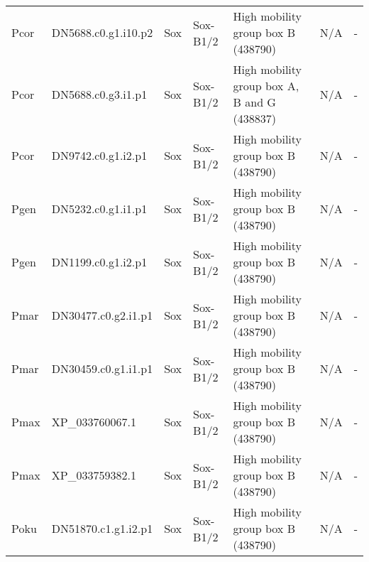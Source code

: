 \documentclass[../main.tex]{subfiles}
\begin{document}
\begin{landscape}
\begin{longtable}{lllllll}
		Pcor           & DN5688.c0.g1.i10.p2   & Sox            & Sox-B1/2            & High mobility group box B (438790)          & N/A                                                                    & -                    \\
		Pcor           & DN5688.c0.g3.i1.p1    & Sox            & Sox-B1/2            & High mobility group box A, B and G (438837) & N/A                                                                    & -                    \\
		Pcor           & DN9742.c0.g1.i2.p1    & Sox            & Sox-B1/2            & High mobility group box B (438790)          & N/A                                                                    & -                    \\
		Pgen           & DN5232.c0.g1.i1.p1    & Sox            & Sox-B1/2            & High mobility group box B (438790)          & N/A                                                                    & -                    \\
		Pgen           & DN1199.c0.g1.i2.p1    & Sox            & Sox-B1/2            & High mobility group box B (438790)          & N/A                                                                    & -                    \\
		Pmar           & DN30477.c0.g2.i1.p1   & Sox            & Sox-B1/2            & High mobility group box B (438790)          & N/A                                                                    & -                    \\
		Pmar           & DN30459.c0.g1.i1.p1   & Sox            & Sox-B1/2            & High mobility group box B (438790)          & N/A                                                                    & -                    \\
		Pmax           & XP\_033760067.1       & Sox            & Sox-B1/2            & High mobility group box B (438790)          & N/A                                                                    & -                    \\
		Pmax           & XP\_033759382.1       & Sox            & Sox-B1/2            & High mobility group box B (438790)          & N/A                                                                    & -                    \\
		Poku           & DN51870.c1.g1.i2.p1   & Sox            & Sox-B1/2            & High mobility group box B (438790)          & N/A                                                                    & -                    \\

\end{longtable}
\end{landscape}
\end{document}
